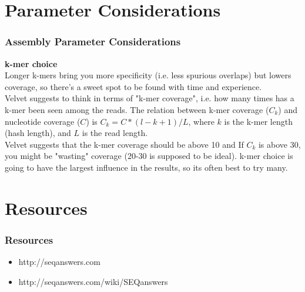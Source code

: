 \documentclass[pdf]{beamer}
\begin{document}
\section{Parameter Considerations}
\begin{frame}
\frametitle{Assembly Parameter Considerations}
\textbf{k-mer choice}\\
Longer k-mers bring you more specificity (i.e. less spurious overlaps) but lowers coverage, so there's a sweet spot to be found with time and experience.\\
\vspace{.1in}
Velvet suggests to think in terms of "k-mer coverage", i.e. how many times has  a k-mer been seen among the reads. The relation between k-mer coverage ($C_k$) and nucleotide coverage ($C$) is $C_k = C*(l-k+1)/L$, where $k$ is the k-mer length (hash length), and $L$ is the read length. \\
\vspace{.1in}
Velvet suggests that the k-mer coverage should be above 10 and If $C_k$ is above 30, you might be "wasting" coverage (20-30 is supposed to be ideal). k-mer choice is going to have the largest influence in the results, so its often best to try many.
\end{frame}

%
%
%

\section{Resources}
\begin{frame}
\frametitle{Resources}
\begin{itemize}
\item http://seqanswers.com
\item http://seqanswers.com/wiki/SEQanswers
\end{itemize}
\end{frame}
\end{document}
